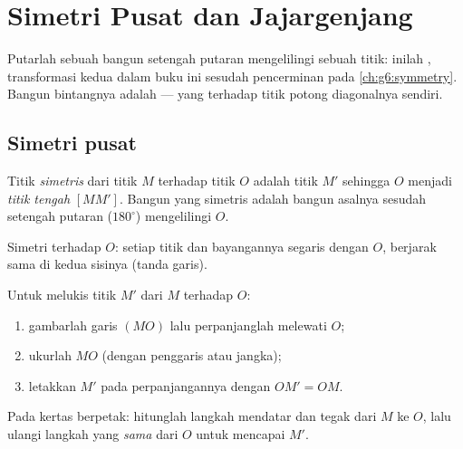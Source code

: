 \chapter{Simetri Pusat dan Jajargenjang}\label{ch:g7:central}

Putarlah sebuah bangun setengah putaran mengelilingi sebuah titik:
inilah \emph{}, transformasi kedua dalam buku ini sesudah
pencerminan pada \cref{ch:g6:symmetry}. Bangun bintangnya adalah
 ---  yang  terhadap titik potong
diagonalnya sendiri.

\section{Simetri pusat}

\begin{definition}\label{def:g7:central:def}
Titik \emph{simetris} dari titik $M$ terhadap
titik $O$ adalah titik $M'$ sehingga $O$ menjadi \emph{titik tengah}
$[MM']$. Bangun yang simetris adalah bangun asalnya sesudah setengah
putaran ($180^\circ$) mengelilingi $O$.
\end{definition}

\begin{omfigure}

{\small Simetri terhadap $O$: setiap titik dan bayangannya segaris
dengan $O$, berjarak sama di kedua sisinya (tanda garis).}
\end{omfigure}

\begin{method}\label{met:g7:central:construct}
Untuk melukis titik  $M'$ dari $M$ terhadap $O$:
\begin{enumerate}
  \item gambarlah garis $(MO)$ lalu perpanjanglah melewati $O$;
  \item ukurlah $MO$ (dengan penggaris atau jangka);
  \item letakkan $M'$ pada perpanjangannya dengan $OM' = OM$.
\end{enumerate}
Pada kertas berpetak: hitunglah langkah mendatar dan tegak dari $M$ ke
$O$, lalu ulangi langkah yang \emph{sama} dari $O$ untuk mencapai $M'$.
\end{method}

